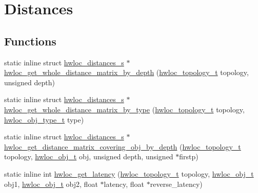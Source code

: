 \hypertarget{a00063}{
\section{Distances}
\label{a00063}
}
\subsection*{Functions}
\begin{DoxyCompactItemize}
\item 
static inline struct \hyperlink{a00014}{hwloc\_\-distances\_\-s} $\ast$ \hyperlink{a00063_ga48dfec8b8ba1fb8f2073ecd0728f0ca6}{hwloc\_\-get\_\-whole\_\-distance\_\-matrix\_\-by\_\-depth} (\hyperlink{a00039_ga9d1e76ee15a7dee158b786c30b6a6e38}{hwloc\_\-topology\_\-t} topology, unsigned depth)
\item 
static inline struct \hyperlink{a00014}{hwloc\_\-distances\_\-s} $\ast$ \hyperlink{a00063_ga9979237728f7a00a38836e15a8e8cd17}{hwloc\_\-get\_\-whole\_\-distance\_\-matrix\_\-by\_\-type} (\hyperlink{a00039_ga9d1e76ee15a7dee158b786c30b6a6e38}{hwloc\_\-topology\_\-t} topology, \hyperlink{a00041_gacd37bb612667dc437d66bfb175a8dc55}{hwloc\_\-obj\_\-type\_\-t} type)
\item 
static inline struct \hyperlink{a00014}{hwloc\_\-distances\_\-s} $\ast$ \hyperlink{a00063_ga186ac2711b98a12cf46d58cd005fbb51}{hwloc\_\-get\_\-distance\_\-matrix\_\-covering\_\-obj\_\-by\_\-depth} (\hyperlink{a00039_ga9d1e76ee15a7dee158b786c30b6a6e38}{hwloc\_\-topology\_\-t} topology, \hyperlink{a00016}{hwloc\_\-obj\_\-t} obj, unsigned depth, unsigned $\ast$firstp)
\item 
static inline int \hyperlink{a00063_ga9addde99e34b815df47625f1d6191839}{hwloc\_\-get\_\-latency} (\hyperlink{a00039_ga9d1e76ee15a7dee158b786c30b6a6e38}{hwloc\_\-topology\_\-t} topology, \hyperlink{a00016}{hwloc\_\-obj\_\-t} obj1, \hyperlink{a00016}{hwloc\_\-obj\_\-t} obj2, float $\ast$latency, float $\ast$reverse\_\-latency)
\end{DoxyCompactItemize}


